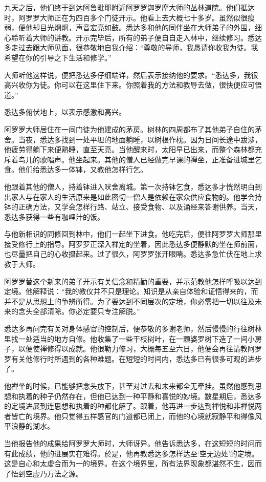 \documentclass[12pt,twoside,openany]{book}
\begin{document}
九天之后，他们终于到达阿鲁毗耶附近阿罗罗迦罗摩大师的丛林道院。他们抵达时，阿罗罗大师正在为四百多个门徒开示。他看上去大概七十多岁。虽然似很瘦弱，便他却目光炯炯，声音宏亮如鼓。悉达多和他的同伴坐在大师弟子的外围，细心聆听着大师的讲教。开示完毕后，所有的弟子便自自走入林中，继续修习。悉达多走过去跟大师见面，很恭敬地自我介绍：“尊敬的导师，我恳请你收我为徒。我希望在你的引导之下生活和修学。”

大师听他这样说，便把悉达多仔细端详，然后表示接纳他的要求。“悉达多，我很高兴收你为徒。你可以在这里住下来。你照着我的方法和教导去做，很快便应可悟道。”

悉达多俯伏地上，以表示感激和高兴。

阿罗罗大师居住在一间门徒为他建成的茅房。树林的四周都布了其他弟子自住的茅舍。当夜，悉达多找到一处平坦的地面躺睡，以树根作枕。因为日间长途中跋涉，他疲劳得躺下来便熟睡，直至天亮。当他醒来时，太阳早已出来，而整个森林都充斥着鸟儿的歌唱声。他坐起来。其他的僧人已经做完早课的禅坐，正准备进城里乞食。他们给悉达多一体钵，又教他怎样行乞。

他跟着其他的僧人，持着钵进入吠舍离城。第一次持钵乞食，悉达多才恍然明白到出家人与在家人的生活原来是如此密切一僧人是依赖在家众供应食物的。他学会持钵的正确方法，又学会怎样行路、站立、接受食物、以及诵经来答谢供养。当天，悉达多获得一些有咖哩汁的饭。

与他新相识的同修回到林中，他们一起坐下进食。他吃完后，便往阿罗罗大师那里接受修行上的指导。阿罗罗正深入禅定的坐着，因此悉达多便静默的坐在师前面，也尽量把自己的心收摄起来。过了很久，阿罗罗张开眼睛。悉达多急忙伏在地上求教于大师。

阿罗罗替这个新来的弟子开示有关信念和精勤的重要，并示范教他怎样呼吸以达到定境。他解释说：“我的教仪并不只是理论。知识是从亲自体验和证悟得来的，而并不是从思想上的争辨所得。为了要达到不同层次的定境，你必需把一切以往及未来的念头全部清除。你必定要只专注解脱。”

悉达多再问完有关对身体感官的控制后，便恭敬的多谢老师，然后慢慢的行往树林里找一处适当的地方自修。他收集了一些干枝树叶，在一颗婆罗树下造了一间小房子，以便使禅修得以成就。他很勒力修习，大概每五至六日，他便会再往请教阿罗罗有关他修行时所遇到的各种难题。在短短的时间内，悉达多已有很多可观的进步了。

他禅坐的时候，已能够把念头放下，甚至对过去和未来都全无牵挂。虽然他感到思想和执着的种子仍然存在，但他已达到一种平静和喜悦的妙境。数星期后，悉达多的定境进展到连思想和执着的种都化解了。跟着，他再进一步达到禅悦和非禅悦两者皆亡的境界。他只觉得五样感官的门道都已闭上，而他的心境就寂静平和得像风平浪静的湖水。

当他报告他的成果给阿罗罗大师时，大师讶异。他告诉悉达多，在这短短的时问而有此成绩，他的进展实在难得。於是，他再教悉达多怎样达至‘空无边处’的定境。这是自心和太虚合而为一的境界。在这个境界里，所有法界现象都湛然不生，因而了悟到空虚乃万法之源。
\end{document}
